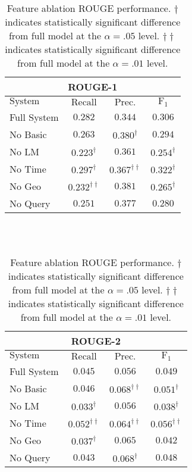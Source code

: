 \begin{table}[h]
\centering
\begin{tabular}{l c c c}
\multicolumn{4}{c}{ROUGE-1}\\
\hline
\hline
$\mathrm{System}$ & $\mathrm{Recall}$ & $\mathrm{Prec.}$ & $\mathrm{F}_1$\\
[0.5ex]
\hline
Full System & $0.282$ & $0.344$ & $0.306$ \\
No Basic    & $0.263$ & $0.380^\dagger$ & $0.294$ \\
No LM       & $0.223^\dagger$ & $0.361$ & $0.254^\dagger$ \\
No Time  & $0.297^\dagger$ & $0.367^{\dagger\dagger}$ & $0.322^\dagger$ \\ 
No Geo   & $0.232^{\dagger\dagger}$ & $0.381$ & $0.265^\dagger$ \\  
No Query & $0.251$ & $0.377$ & $0.280$ \\ 
\hline %
\end{tabular}
~\\[1ex]
~\\
\begin{tabular}{l c c c}
\multicolumn{4}{c}{ROUGE-2}\\
\hline
\hline
$\mathrm{System}$ & $\mathrm{Recall}$ & $\mathrm{Prec.}$ & $\mathrm{F}_1$\\[0.5ex]
\hline
Full System & $0.045$ & $0.056$ & $0.049$ \\
No Basic    & $0.046$ & $0.068^{\dagger\dagger}$ & $0.051^\dagger$ \\
No LM       & $0.033^\dagger$ & $0.056$ & $0.038^\dagger$ \\
No Time  & $0.052^{\dagger\dagger}$ & $0.064^{\dagger\dagger}$ & $0.056^{\dagger\dagger}$ \\
No Geo   & $0.037^\dagger$ & $0.065$ & $0.042$ \\
No Query & $0.043$ & $0.068^\dagger$ & $0.048$ \\
\hline %
\end{tabular}
\caption{Feature ablation ROUGE performance. 
    $\dagger$ indicates statistically significant difference from 
full model at the $\alpha=.05$ level.
    $\dagger\dagger$ indicates statistically significant difference from 
full model at the $\alpha=.01$ level.
    } %
\label{tab:farouge}
\end{table}






